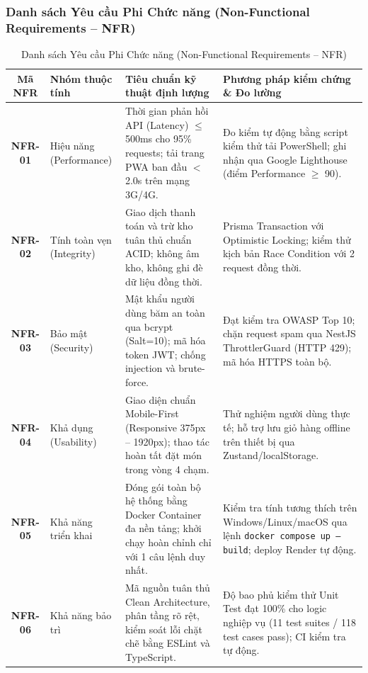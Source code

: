 \documentclass[11pt,a4paper]{article}
\begin{document}
\subsubsection{Danh sách Yêu cầu Phi Chức năng (Non-Functional Requirements -- NFR)}

\begin{table}[H]
\centering
\small
\renewcommand{\arraystretch}{0.90}
\begin{tabularx}{\linewidth}{|c|p{3.0cm}|p{4.8cm}|Y|}
\hline
{}
\textbf{Mã NFR} & \textbf{Nhóm thuộc tính} & \textbf{Tiêu chuẩn kỹ thuật định lượng} & \textbf{Phương pháp kiểm chứng \& Đo lường} \\ \hline
\textbf{NFR-01} & Hiệu năng (Performance) & Thời gian phản hồi API (Latency) $\le$ 500ms cho 95\% requests; tải trang PWA ban đầu $<$ 2.0s trên mạng 3G/4G. & Đo kiểm tự động bằng script kiểm thử tải PowerShell; ghi nhận qua Google Lighthouse (điểm Performance $\ge$ 90). \\ \hline
\textbf{NFR-02} & Tính toàn vẹn (Integrity) & Giao dịch thanh toán và trừ kho tuân thủ chuẩn ACID; không âm kho, không ghi đè dữ liệu đồng thời. & Prisma Transaction với Optimistic Locking; kiểm thử kịch bản Race Condition với 2 request đồng thời. \\ \hline
\textbf{NFR-03} & Bảo mật (Security) & Mật khẩu người dùng băm an toàn qua bcrypt (Salt=10); mã hóa token JWT; chống injection và brute-force. & Đạt kiểm tra OWASP Top 10; chặn request spam qua NestJS ThrottlerGuard (HTTP 429); mã hóa HTTPS toàn bộ. \\ \hline
\textbf{NFR-04} & Khả dụng (Usability) & Giao diện chuẩn Mobile-First (Responsive 375px -- 1920px); thao tác hoàn tất đặt món trong vòng 4 chạm. & Thử nghiệm người dùng thực tế; hỗ trợ lưu giỏ hàng offline trên thiết bị qua Zustand/localStorage. \\ \hline
\textbf{NFR-05} & Khả năng triển khai & Đóng gói toàn bộ hệ thống bằng Docker Container đa nền tảng; khởi chạy hoàn chỉnh chỉ với 1 câu lệnh duy nhất. & Kiểm tra tính tương thích trên Windows/Linux/macOS qua lệnh \texttt{docker compose up --build}; deploy Render tự động. \\ \hline
\textbf{NFR-06} & Khả năng bảo trì & Mã nguồn tuân thủ Clean Architecture, phân tầng rõ rệt, kiểm soát lỗi chặt chẽ bằng ESLint và TypeScript. & Độ bao phủ kiểm thử Unit Test đạt 100\% cho logic nghiệp vụ (11 test suites / 118 test cases pass); CI kiểm tra tự động. \\ \hline
\end{tabularx}
\caption{Danh sách Yêu cầu Phi Chức năng (Non-Functional Requirements -- NFR)}
\label{tab:nfr}
\end{table}
\end{document}
